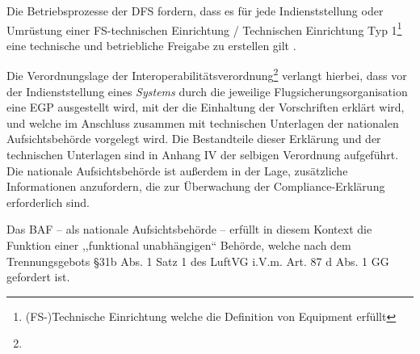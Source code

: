     \noindent
    Die Betriebsprozesse der \ac{DFS} fordern, dass es für jede Indienststellung oder Umrüstung einer FS-technischen Einrichtung / Technischen Einrichtung Typ 1\footnote{(FS-)Technische Einrichtung welche die Definition von \atmans{} Equipment erfüllt} eine technische und betriebliche Freigabe zu erstellen gilt 
    \cite{fa_freigaben}.

    \medskip
    Die Verordnungslage der Interoperabilitätsverordnung\footnote{} verlangt hierbei, dass vor der Indienststellung eines \textit{Systems} durch die jeweilige Flugsicherungsorganisation eine \acf{EGP} ausgestellt wird, mit der die Einhaltung der Vorschriften erklärt wird, und welche im Anschluss zusammen mit technischen Unterlagen der nationalen Aufsichtsbehörde vorgelegt wird. 
    Die Bestandteile dieser Erklärung und der technischen Unterlagen sind in Anhang IV der selbigen Verordnung aufgeführt. 
    Die nationale Aufsichtsbehörde ist außerdem in der Lage, zusätzliche Informationen anzufordern, die zur Überwachung der Compliance-Erklärung erforderlich sind.
    \cite[Art.6 Abs.2]{2004R0552}

    \medskip
    Das \acf{BAF} -- als nationale Aufsichtsbehörde -- erfüllt in diesem Kontext die Funktion einer ,,funktional unabhängigen``\cite[Art. 4 Abs. 1f]{2004R0549} Behörde, welche nach dem Trennungsgebots §31b Abs. 1 Satz 1 des \ac{LuftVG} i.V.m. Art. 87 d Abs. 1 \ac{GG} gefordert ist.
    \cite[S. 14]{eu_ses_studie} 
     
